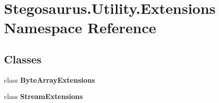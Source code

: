 \hypertarget{namespace_stegosaurus_1_1_utility_1_1_extensions}{}\section{Stegosaurus.\+Utility.\+Extensions Namespace Reference}
\label{namespace_stegosaurus_1_1_utility_1_1_extensions}
\subsection*{Classes}
\begin{DoxyCompactItemize}
\item 
class {\bfseries Byte\+Array\+Extensions}
\item 
class {\bfseries Stream\+Extensions}
\end{DoxyCompactItemize}
